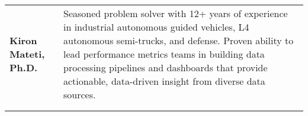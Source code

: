 \begin{tabular}{L{\lcolw} L{\rcolw}}
    \textbf{\LARGE {Kiron Mateti, Ph.D.}} 
    & {\large Seasoned problem solver with 12+ years of experience in industrial autonomous guided vehicles, L4 autonomous semi-trucks, and defense. 
    Proven ability to lead performance metrics teams in building data processing pipelines and dashboards that provide actionable, data-driven insight from diverse data sources.
    }
    \\ 
    \\
    \hline \hline \\ 
    \end{tabular}